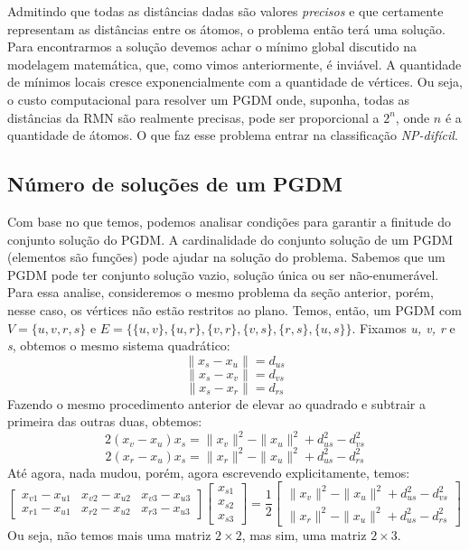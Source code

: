 \documentclass[a4paper,12pt]{article}
\begin{document}
	Admitindo que todas as distâncias dadas são valores \textit{precisos} e que certamente representam as distâncias entre os átomos, o problema então terá uma solução. Para encontrarmos a solução devemos achar o mínimo global discutido na modelagem matemática, que, como vimos anteriormente, é inviável. A quantidade de mínimos locais cresce exponencialmente com a quantidade de vértices. Ou seja, o custo computacional para resolver um PGDM onde, suponha, todas as distâncias da RMN são realmente precisas, pode ser proporcional a $2^n$, onde $n$ é a quantidade de átomos. O que faz esse problema entrar na classificação \textit{NP-difícil}. \cite{ComplexidadeComp}
	\\
	\subsection{Número de soluções de um PGDM}
	Com base no que temos, podemos analisar condições para garantir a finitude do conjunto solução do PGDM. A cardinalidade do conjunto solução de um PGDM (elementos são funções) pode ajudar na solução do problema. Sabemos que um PGDM pode ter conjunto solução vazio, solução única ou ser não-enumerável. Para essa analise, consideremos o mesmo problema da seção anterior, porém, nesse caso, os vértices não estão restritos ao plano. Temos, então, um PGDM com $V=\{u, v, r, s\}$ e $E=\{\{u,v\}, \{u, r\}, \{v, r\}, \{v, s\}, \{r, s\}, \{u, s\}\}$. Fixamos \textit{u, v, r} e \textit{s}, obtemos o mesmo sistema quadrático:
	$$
	\|x_{s} - x_{u}\|= d_{us}
	$$
	$$
	\|x_{s} - x_{v}\|= d_{vs}
	$$
	$$
	\|x_{s} - x_{r}\|= d_{rs}
	$$
	Fazendo o mesmo procedimento anterior de elevar ao quadrado e subtrair a primeira das outras duas, obtemos:
	$$
	2(x_{v} - x_{u})x_{s} = \|x_{v}\|^{2} - \|x_{u}\|^{2} + d_{us}^{2} - d_{vs}^{2}
	$$
	$$
	2(x_{r} - x_{u})x_{s} = \|x_{r}\|^{2} - \|x_{u}\|^{2} + d_{us}^{2} - d_{rs}^{2}
	$$
	Até agora, nada mudou, porém, agora escrevendo explicitamente, temos:
	$$
	\begin{bmatrix}
	x_{v1} - x_{u1} & x_{v2} - x_{u2} & x_{v3} - x_{u3}\\
	x_{r1} - x_{u1} & x_{r2} - x_{u2} & x_{r3} - x_{u3}
	\end{bmatrix}
	\begin{bmatrix}
	x_{s1}\\
	x_{s2}\\
	x_{s3}
	\end{bmatrix} =
	\frac{1}{2}\begin{bmatrix}
	\|x_{v}\|^{2} - \|x_{u}\|^{2} + d_{us}^{2} - d_{vs}^{2}\\
	\|x_{r}\|^{2} - \|x_{u}\|^{2} + d_{us}^{2} - d_{rs}^{2}
	\end{bmatrix}
	$$
	Ou seja, não temos mais uma matriz $2 \times 2$, mas  sim, uma matriz $2 \times 3$.
	
\end{document}
